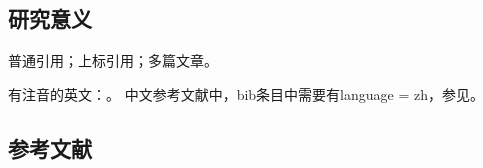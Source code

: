 
\subsection{研究意义}
\vspace{-5pt}

普通引用\cite{test}；上标引用；多篇文章。

有注音的英文：\cite{test}。
中文参考文献中，bib条目中需要有language = {zh}，参见\cite{test2}。

\begin{REF}
\subsection*{参考文献}
\vspace{-50pt}

\end{REF}

